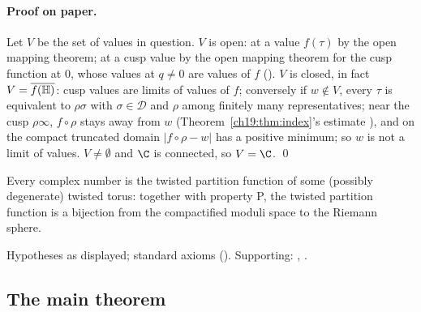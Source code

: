 \paragraph{Proof on paper.}  Let $V$ be the set of values in question.  $V$ is open: at a value $f(\tau)$ by the open mapping theorem; at a cusp
value by the open mapping theorem for the cusp function at $0$, whose values at $q\ne0$ are values of $f$
().  $V$ is closed, in fact $V=\overline{f(\mathbb{H})}$: cusp values are limits of values of $f$;
conversely if $w\notin V$, every $\tau$ is equivalent to $\rho\sigma$ with $\sigma\in\mathcal D$ and $\rho$ among finitely many representatives; near the cusp
$\rho\infty$, $f\circ\rho$ stays away from $w$ (Theorem~\ref{ch19:thm:index}'s estimate ), and on the compact
truncated domain $|f\circ\rho-w|$ has a positive minimum; so $w$ is not a limit of values.  $V\ne\emptyset$ and $\C$ is connected, so $V=\C$. \qed
\begin{physics}Every complex number is the twisted partition function of some (possibly degenerate) twisted torus: together with property
P, the twisted partition function is a bijection from the compactified moduli space to the Riemann sphere.\end{physics}
\begin{status}Hypotheses as displayed; standard axioms ().  Supporting:
, .\end{status}

\subsection{The main theorem}

